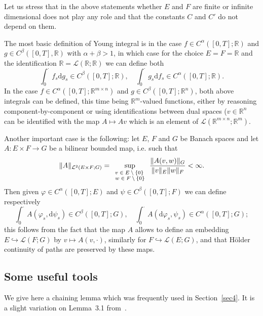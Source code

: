 \documentclass[10pt]{article}
\newcommand{\mathd}{\mathrm{d}}
\newcommand{\tmscript}[1]{\text{\scriptsize{$#1$}}}
\begin{document}
Let us stress that in the above statements whether $E$ and $F$ are finite or
infinite dimensional does not play any role and that the constants $C$ and
$C'$ do not depend on them.

The most basic definition of Young integral is in the case $f \in C^{\alpha}
([0, T] ; \mathbb{R})$ and $g \in C^{\beta} ([0, T], \mathbb{R})$ with $\alpha
+ \beta > 1$, in which case for the choice $E = F =\mathbb{R}$ and the
identification $\mathbb{R}= \mathcal{L} (\mathbb{R}; \mathbb{R})$ we can
define both
\[ \int_0^{\cdot} f_s \mathd g_s \in C^{\beta} ([0, T] ; \mathbb{R}), \quad
   \int_0^{\cdot} g_s \mathd f_s \in C^{\alpha} ([0, T] ; \mathbb{R}) . \]
In the case $f \in C^{\alpha} ([0, T] ; \mathbb{R}^{m \times n})$ and $g \in
C^{\beta} ([0, T] ; \mathbb{R}^n)$, both above integrals can be defined, this
time being $\mathbb{R}^m$\mbox{-}valued functions, either by reasoning
component\mbox{-}by\mbox{-}component or using identifications between dual
spaces ($v \in \mathbb{R}^n$ can be identified with the map $A \mapsto A v$
which is an element of $\mathcal{L} (\mathbb{R}^{m \times n} ; \mathbb{R}^m)$.

Another important case is the following: let $E$, $F$ and $G$ be Banach spaces
and let $A : E \times F \rightarrow G$ be a bilinear bounded map, i.e. such
that
\[ \| A \|_{\mathcal{L}^2 (E \times F ; G)} = \sup_{\tmscript{\begin{array}{l}
     v \in E \setminus \{ 0 \}\\
     w \in F \setminus \{ 0 \}
   \end{array}}} \frac{\| A (v, w) \|_G}{\| v \|_E \| w \|_F} < \infty . \]
Then given $\varphi \in C^{\alpha} ([0, T] ; E)$ and $\psi \in C^{\beta} ([0,
T] ; F)$ we can define respectively
\[ \int_0^{\cdot} A (\varphi_s, \mathd \psi_s) \in C^{\beta} ([0, T] ; G),
   \quad \int_0^{\cdot} A (\mathd \varphi_s, \psi_s) \in C^{\alpha} ([0, T] ;
   G) ; \]
this follows from the fact that the map $A$ allows to define an embedding $E
\hookrightarrow \mathcal{L} (F ; G)$ by $v \mapsto A (v, \cdot)$, similarly
for $F \hookrightarrow \mathcal{L} (E ; G)$, and that H\"{o}lder continuity of
paths are preserved by these maps.

\subsection{Some useful tools}\label{appendixA2}

We give here a chaining lemma which was frequently used in Section~\ref{sec4}.
It is a slight variation on Lemma~3.1 from~{\cite{catelliergubinelli}}.
\end{document}
